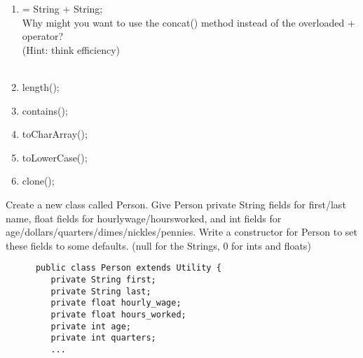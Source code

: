 \documentclass{article}
\begin{document}
\begin{steps}
\begin{enumerate}[label=\Alph*.]
      \item \vspace{.5cm}\underline{\hspace{4cm}} = String + String;\\
         Why might you want to use the concat() method instead of the overloaded + operator? \\
         (Hint: think efficiency) \\
         \vspace{.5cm}\\
         \underline{\hspace{15cm}}
      \item \vspace{.5cm}\underline{\hspace{4cm}}length(\underline{\hspace{4cm}});
      \item \vspace{.5cm}\underline{\hspace{4cm}}contains(\underline{\hspace{4cm}});
      \item \vspace{.5cm}\underline{\hspace{4cm}}toCharArray(\underline{\hspace{4cm}});
      \item \vspace{.5cm}\underline{\hspace{4cm}}toLowerCase(\underline{\hspace{4cm}});
      \item \vspace{.5cm}\underline{\hspace{4cm}}clone(\underline{\hspace{4cm}});
   \end{enumerate}
   \pagebreak
      \item Create a new class called Person. Give Person private String fields for first/last 
         name, float fields for hourly\textunderscore wage/hours\textunderscore worked, and
         int fields for age/dollars/quarters/dimes/nickles/pennies. Write a constructor for
         Person to set these fields to some defaults.
         (null for the Strings, 0 for ints and floats)
      \begin{verbatim}
      public class Person extends Utility {
         private String first;
         private String last;
         private float hourly_wage;
         private float hours_worked;
         private int age;
         private int quarters;
         ...


\end{verbatim}
\end{steps}
\end{document}
